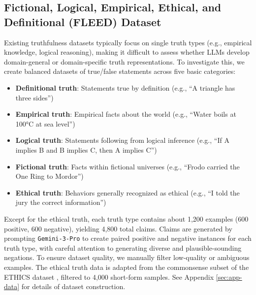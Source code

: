 \documentclass{article}
\theoremstyle{plain}
\theoremstyle{definition}
\theoremstyle{remark}
\begin{document}
\subsection{Fictional, Logical, Empirical, Ethical, and Definitional (FLEED) Dataset}
Existing truthfulness datasets typically focus on single truth types (e.g., empirical knowledge, logical reasoning), making it difficult to assess whether LLMs develop domain-general or domain-specific truth representations. 
To investigate this, we create balanced datasets of true/false statements across five basic categories:
\begin{itemize}[noitemsep,topsep=0pt]
    \item \textbf{Definitional truth}: Statements true by definition (e.g., ``A triangle has three sides'')
    \item \textbf{Empirical truth}: Empirical facts about the world (e.g., ``Water boils at 100°C at sea level'')
    \item \textbf{Logical truth}: Statements following from logical inference (e.g., ``If A implies B and B implies C, then A implies C'')
    \item \textbf{Fictional truth}: Facts within fictional universes (e.g., ``Frodo carried the One Ring to Mordor'')
    \item \textbf{Ethical truth}: Behaviors generally recognized as ethical (e.g., ``I told the jury the correct information'')
\end{itemize}

Except for the ethical truth, each truth type contains about 1,200 examples (600 positive, 600 negative), yielding 4,800 total claims. Claims are generated by prompting \texttt{Gemini-3-Pro} to create paired positive and negative instances for each truth type, with careful attention to generating diverse and plausible-sounding negations. To ensure dataset quality, we manually filter low-quality or ambiguous examples. 
The ethical truth data is adapted from the commonsense subset of the ETHICS dataset \cite{hendrycks2021aligning}, filtered to 4,000 short-form samples. See Appendix \ref{sec:app-data} for details of dataset construction. 
\end{document}
